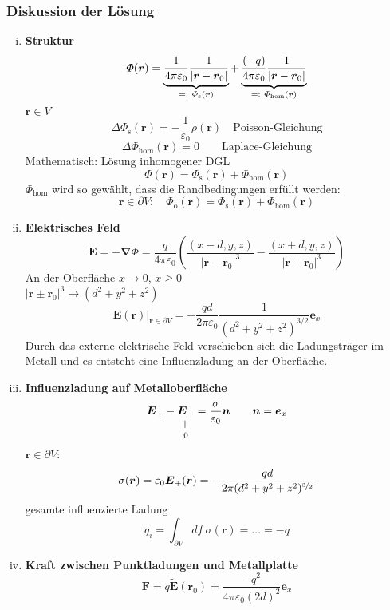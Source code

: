 \documentclass[titlepage,11pt,a4paper,ngerman]{report}
\newcommand*{\eqdef}{=\mathrel{\vcenter{\baselineskip0.5ex \lineskiplimit0pt \hbox{\scriptsize.}\hbox{\scriptsize.}}}}
\newcommand{\tx}[1]{\textrm{#1}}
\newcommand{\verteq}{\rotatebox{90}{$\,=$}}
\newcommand{\equalto}[2]{\underset{\scriptstyle\overset{\mkern4mu\verteq}{#2}}{#1}}
\newcommand{\eofr}{\vec{E}(\vec{r})}
\newcommand{\pofr}{\Phi(\vec{r})}
\renewcommand{\Phi}{\varPhi}
\newcommand{\kq}{\frac{1}{4\pi\epsilon_0}}
\renewcommand{\vec}[1]{\boldsymbol{#1}}
\newcommand{\lcom}[1]{\color{MidnightBlue}#1\color{black}}
\renewcommand{\epsilon}{\varepsilon}
\begin{document}
\subsubsection{Diskussion der Lösung}
\begin{enumerate}[i)]
	\item \textbf{Struktur}
	$$\pofr = \underbrace{\kq \frac{1}{|\vec{r}-\vec{r}_0|}}_{\eqdef\ \Phi_{\textrm{s}}(\vec{r})} + \underbrace{\frac{(-q)}{4 \pi \epsilon_0} \frac{1}{|\vec{r}-\vec{r}_0|}}_{\eqdef\ \Phi_{\textrm{hom}}(\vec{r})}$$ 
	$ \vec{r} \in V $
	\begin{equation*}
	\Delta \Phi_\tx{s}(\vec{r}) = - \frac{1}{\epsilon_0} \rho(\vec{r}) \quad \tx{Poisson-Gleichung}
	\end{equation*}
	\begin{equation*}
	\Delta \Phi_{\tx{hom}} (\vec{r}) = 0 \qquad \tx{Laplace-Gleichung}
	\end{equation*}
	Mathematisch: Lösung inhomogener DGL
	\begin{equation*}
	\pofr = \Phi_\tx{s}(\vec{r}) + \Phi_{\tx{hom}}(\vec{r})
	\end{equation*}
	$ \Phi_{\tx{hom}} $ wird so gewählt, dass die Randbedingungen erfüllt werden:
	\begin{equation*}
	\vec{r} \in \partial V: \quad \Phi_\tx{o} (\vec{r}) = \Phi_\tx{s}(\vec{r}) + \Phi_{\tx{hom}}(\vec{r})
	\end{equation*}
	\item \textbf{Elektrisches Feld}
	\begin{equation*}
	\vec{E} = - \vec{\nabla} \Phi = \frac{q}{4 \pi \epsilon_0} \left(\frac{(x-d,y,z)}{|\vec{r} - \vec{r}_0|^3} - \frac{(x+d,y,z)}{|\vec{r} + \vec{r}_0|^3}\right)
	\end{equation*}
	An der Oberfläche $ x \to 0 $, $ x \ge 0 $\\
	$ |\vec{r} \pm \vec{r}_0|^3 \rightarrow (d^2 + y^2 + z^2) $\\
	\begin{equation*}
	\eofr \bigg|_{\vec{r} \in \partial V} = - \frac{qd}{2 \pi \epsilon_0} \frac{1}{(d^2 + y^2 + z^2) ^{3/2}} \vec{e}_x
	\end{equation*}
	\lcom{Durch das externe elektrische Feld verschieben sich die Ladungsträger im Metall und es entsteht eine Influenzladung an der Oberfläche.}
	\item \textbf{Influenzladung auf Metalloberfläche}
	$$\vec{E}_+ - \equalto{\vec{E}_-}{0} = \frac{\sigma}{\epsilon_0} \vec{n} \qquad \vec{n} = \vec{e}_x$$
	$\vec{r} \in \partial V$:
	$$\sigma (\vec{r}) = \epsilon_0 \vec{E}_+(\vec{r}) = - \frac{qd}{2 \pi(d^2 + y^2 + z^2)^{\nicefrac{3}{2}}}$$
	gesamte influenzierte Ladung
	$$q_i = \int_{\partial V} df\ \sigma(\vec{r}) = \dots = -q$$
	\item \textbf{Kraft zwischen Punktladungen und Metallplatte}
	$$\vec{F} = q \vec{\tilde{E}}(\vec{r}_0) = \frac{-q^2}{4 \pi \epsilon_0 (2d)^2}\vec{e}_x$$
\end{enumerate}
\end{document}
